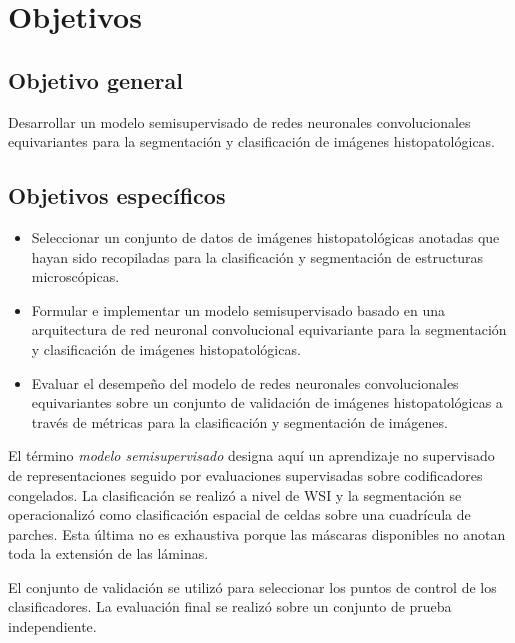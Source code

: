 \chapter{Objetivos}
\section{Objetivo general}

Desarrollar un modelo semisupervisado de redes neuronales convolucionales equivariantes para la segmentación y clasificación de imágenes histopatológicas.

\section{Objetivos específicos}

\begin{itemize}
    \item Seleccionar un conjunto de datos de imágenes histopatológicas anotadas que hayan sido recopiladas para la clasificación y segmentación de estructuras microscópicas.

    \item Formular e implementar un modelo semisupervisado basado en una arquitectura de red neuronal convolucional equivariante para la segmentación y clasificación de imágenes histopatológicas.

    \item Evaluar el desempeño del modelo de redes neuronales convolucionales equivariantes sobre un conjunto de validación de imágenes histopatológicas a través de métricas para la clasificación y segmentación de imágenes.

\end{itemize}

El término \emph{modelo
semisupervisado} designa aquí un aprendizaje no supervisado de representaciones
seguido por evaluaciones supervisadas sobre codificadores congelados. La
clasificación se realizó a nivel de WSI y la segmentación se operacionalizó como
clasificación espacial de celdas sobre una cuadrícula de parches. Esta última no
es exhaustiva porque las máscaras disponibles no anotan toda la extensión de las
láminas.

El conjunto de validación se utilizó para seleccionar los puntos de control de
los clasificadores. La evaluación final se realizó sobre un conjunto de prueba
independiente.
